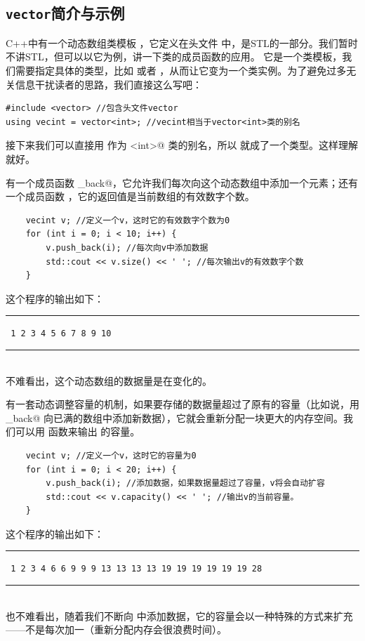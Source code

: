 \subsection*{\texttt{vector}简介与示例}
C++中有一个动态数组类模板 \lstinline@vector@，它定义在头文件 \lstinline@vector@ 中，是STL的一部分。我们暂时不讲STL，但可以以它为例，讲一下类的成员函数的应用。
它是一个类模板，我们需要指定具体的类型，比如 \lstinline@int@ 或者 \lstinline@double@，从而让它变为一个类实例。为了避免过多无关信息干扰读者的思路，我们直接这么写吧：
\begin{lstlisting}
#include <vector> //包含头文件vector
using vecint = vector<int>; //vecint相当于vector<int>类的别名
\end{lstlisting}
接下来我们可以直接用 \lstinline@vecint@ 作为 \lstinline@vector<int>@ 类的别名，所以 \lstinline@vecint@ 就成了一个类型。这样理解就好。\par
\lstinline@vecint@ 有一个成员函数 \lstinline@push_back@，它允许我们每次向这个动态数组中添加一个元素；还有一个成员函数 \lstinline@size@，它的返回值是当前数组的有效数字个数。
\begin{lstlisting}
    vecint v; //定义一个v，这时它的有效数字个数为0
    for (int i = 0; i < 10; i++) {
        v.push_back(i); //每次向v中添加数据
        std::cout << v.size() << ' '; //每次输出v的有效数字个数
    }
\end{lstlisting}
这个程序的输出如下：\\\noindent\rule{\linewidth}{.2pt}\texttt{
1 2 3 4 5 6 7 8 9 10
}\\\noindent\rule{\linewidth}{.2pt}\\
不难看出，这个动态数组的数据量是在变化的。\par
\lstinline@vecint@ 有一套动态调整容量的机制，如果要存储的数据量超过了原有的容量（比如说，用 \lstinline@push_back@ 向已满的数组中添加新数据），它就会重新分配一块更大的内存空间。我们可以用 \lstinline@capacity@ 函数来输出 \lstinline@v@ 的容量。
\begin{lstlisting}
    vecint v; //定义一个v，这时它的容量为0
    for (int i = 0; i < 20; i++) {
        v.push_back(i); //添加数据，如果数据量超过了容量，v将会自动扩容
        std::cout << v.capacity() << ' '; //输出v的当前容量。
    }
\end{lstlisting}
这个程序的输出如下：\\\noindent\rule{\linewidth}{.2pt}\texttt{
1 2 3 4 6 6 9 9 9 13 13 13 13 19 19 19 19 19 19 28
}\\\noindent\rule{\linewidth}{.2pt}\\
也不难看出，随着我们不断向 \lstinline@v@ 中添加数据，它的容量会以一种特殊的方式来扩充——不是每次加一（重新分配内存会很浪费时间）。\par

